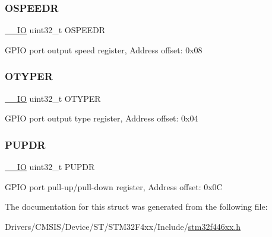 \subsubsection{\texorpdfstring{O\+S\+P\+E\+E\+DR}{OSPEEDR}}
{\footnotesize\ttfamily \mbox{\hyperlink{core__sc300_8h_aec43007d9998a0a0e01faede4133d6be}{\+\_\+\+\_\+\+IO}} uint32\+\_\+t O\+S\+P\+E\+E\+DR}

G\+P\+IO port output speed register, Address offset\+: 0x08 \mbox{\label{struct_g_p_i_o___type_def_a9543592bda60cb5261075594bdeedac9}} 
\subsubsection{\texorpdfstring{O\+T\+Y\+P\+ER}{OTYPER}}
{\footnotesize\ttfamily \mbox{\hyperlink{core__sc300_8h_aec43007d9998a0a0e01faede4133d6be}{\+\_\+\+\_\+\+IO}} uint32\+\_\+t O\+T\+Y\+P\+ER}

G\+P\+IO port output type register, Address offset\+: 0x04 \mbox{\label{struct_g_p_i_o___type_def_abeed38529bd7b8de082e490e5d4f1727}} 
\subsubsection{\texorpdfstring{P\+U\+P\+DR}{PUPDR}}
{\footnotesize\ttfamily \mbox{\hyperlink{core__sc300_8h_aec43007d9998a0a0e01faede4133d6be}{\+\_\+\+\_\+\+IO}} uint32\+\_\+t P\+U\+P\+DR}

G\+P\+IO port pull-\/up/pull-\/down register, Address offset\+: 0x0C 

The documentation for this struct was generated from the following file\+:\begin{DoxyCompactItemize}
\item 
Drivers/\+C\+M\+S\+I\+S/\+Device/\+S\+T/\+S\+T\+M32\+F4xx/\+Include/\mbox{\hyperlink{stm32f446xx_8h}{stm32f446xx.\+h}}\end{DoxyCompactItemize}
